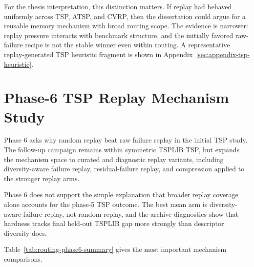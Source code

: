 For the thesis interpretation, this distinction matters. If replay had behaved uniformly across
TSP, ATSP, and CVRP, then the dissertation could argue for a reusable memory mechanism with broad
routing scope. The evidence is narrower: replay pressure interacts with benchmark structure, and
the initially favored raw-failure recipe is not the stable winner even within routing. A
representative replay-generated TSP heuristic fragment is shown in
Appendix~\ref{sec:appendix-tsp-heuristic}.

\section{Phase-6 TSP Replay Mechanism Study}
\label{sec:routing-phase6}

Phase 6 asks why random replay beat raw failure replay in the initial TSP study. The follow-up
campaign remains within symmetric TSPLIB TSP, but expands the mechanism space to curated and
diagnostic replay variants, including diversity-aware failure replay, residual-failure replay, and
compression applied to the stronger replay arms.

Phase 6 does not support the simple explanation that broader replay coverage alone accounts for the
phase-5 TSP outcome. The best mean arm is diversity-aware failure replay, not random replay, and
the archive diagnostics show
that hardness tracks final held-out TSPLIB gap more strongly than descriptor diversity does.

Table~\ref{tab:routing-phase6-summary} gives the most important mechanism comparisons.

